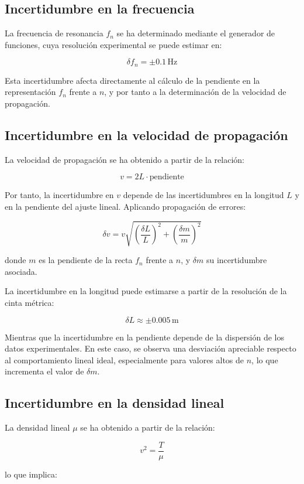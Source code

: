 \documentclass{article}
\begin{document}
\subsection{Incertidumbre en la frecuencia}

La frecuencia de resonancia $f_n$ se ha determinado mediante el generador de funciones, cuya resolución experimental se puede estimar en:

\[
\delta f_n = \pm 0.1\,\text{Hz}
\]

Esta incertidumbre afecta directamente al cálculo de la pendiente en la representación $f_n$ frente a $n$, y por tanto a la determinación de la velocidad de propagación.

\subsection{Incertidumbre en la velocidad de propagación}

La velocidad de propagación se ha obtenido a partir de la relación:

\[
v = 2L \cdot \text{pendiente}
\]

Por tanto, la incertidumbre en $v$ depende de las incertidumbres en la longitud $L$ y en la pendiente del ajuste lineal. Aplicando propagación de errores:

\[
\delta v = v \sqrt{\left(\frac{\delta L}{L}\right)^2 + \left(\frac{\delta m}{m}\right)^2}
\]

donde $m$ es la pendiente de la recta $f_n$ frente a $n$, y $\delta m$ su incertidumbre asociada.

La incertidumbre en la longitud puede estimarse a partir de la resolución de la cinta métrica:

\[
\delta L \approx \pm 0.005\,\text{m}
\]

Mientras que la incertidumbre en la pendiente depende de la dispersión de los datos experimentales. En este caso, se observa una desviación apreciable respecto al comportamiento lineal ideal, especialmente para valores altos de $n$, lo que incrementa el valor de $\delta m$.

\subsection{Incertidumbre en la densidad lineal}

La densidad lineal $\mu$ se ha obtenido a partir de la relación:

\[
v^2 = \frac{T}{\mu}
\]

lo que implica:
\end{document}
